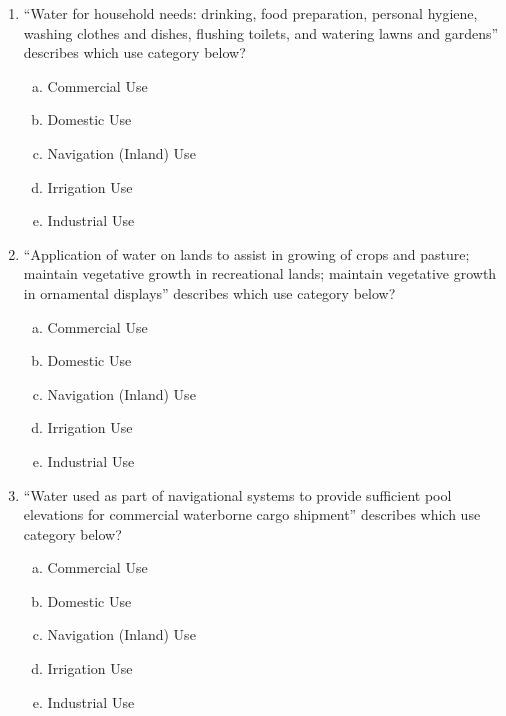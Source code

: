 \documentclass[11pt]{article}
\begin{document}
\clearpage
\begin{enumerate}
\item ``Water for household needs: drinking, food preparation, personal hygiene, washing clothes and dishes, flushing toilets, and watering lawns and gardens'' describes which use category below?
\begin{enumerate}[a)]
\item Commercial Use
\item Domestic Use
\item Navigation (Inland) Use
\item Irrigation Use
\item Industrial Use
\end{enumerate}

\item ``Application of water on lands to assist in growing of crops and pasture; maintain vegetative growth in recreational lands; maintain vegetative growth in ornamental displays'' describes which use category below?
\begin{enumerate}[a)]
\item Commercial Use
\item Domestic Use
\item Navigation (Inland) Use
\item Irrigation Use
\item Industrial Use
\end{enumerate}


\item ``Water used as part of navigational systems to provide sufficient pool elevations for commercial waterborne cargo shipment'' describes which use category below?
\begin{enumerate}[a)]
\item Commercial Use
\item Domestic Use
\item Navigation (Inland) Use
\item Irrigation Use
\item Industrial Use
\end{enumerate}


\end{enumerate}
\end{document}
